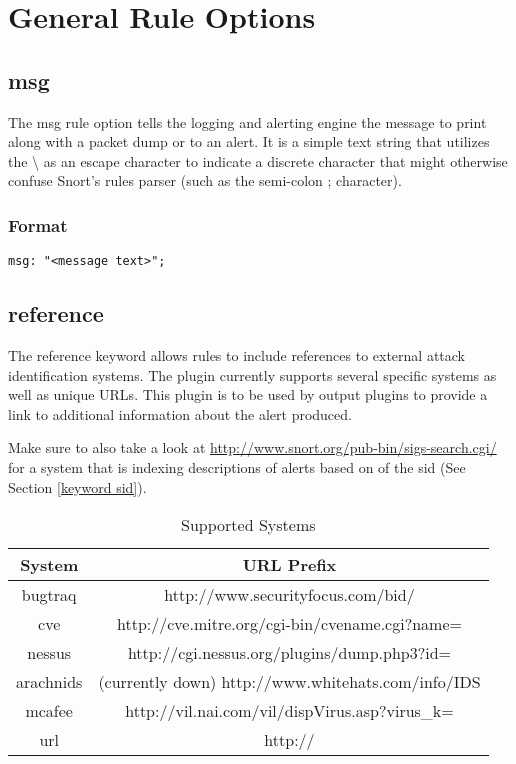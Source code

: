 \documentclass[english]{report}
\begin{document}
\section{General Rule Options}

\subsection{msg}

The msg rule option tells the logging and alerting engine the message to print
along with a packet dump or to an alert. It is a simple text string that
utilizes the \textbackslash{} as an escape character to indicate a discrete
character that might otherwise confuse Snort's rules parser (such as the
semi-colon ; character).

\subsubsection{Format}

\begin{verbatim}
msg: "<message text>";
\end{verbatim}

\subsection{reference}

The reference keyword allows rules to include references to external
attack identification systems. The plugin currently supports several
specific systems as well as unique URLs. This plugin is to be used
by output plugins to provide a link to additional information about
the alert produced.

Make sure to also take a look at \url{http://www.snort.org/pub-bin/sigs-search.cgi/}
for a system that is indexing descriptions of alerts based on of
the sid (See Section \ref{keyword sid}).
\begin{table}[!hbpt]

\caption{Supported Systems \label{references systems}}

\begin{center}\begin{tabular}{|c|c|}
\hline 
System&
URL Prefix\\
\hline
\hline 
bugtraq&
http://www.securityfocus.com/bid/\\
\hline 
cve&
http://cve.mitre.org/cgi-bin/cvename.cgi?name=\\
\hline 
nessus &
http://cgi.nessus.org/plugins/dump.php3?id=\\
\hline 
arachnids&
(currently down) http://www.whitehats.com/info/IDS\\
\hline 
mcafee&
http://vil.nai.com/vil/dispVirus.asp?virus\_k=\\
\hline 
url&
http://\\
\hline
\end{tabular}\end{center}
\end{table}
\end{document}
